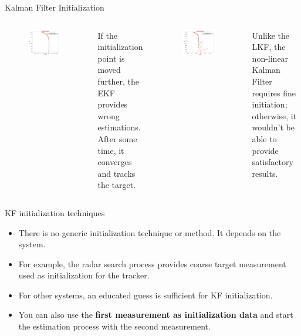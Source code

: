 \begin{frame}{Kalman Filter Initialization}
\begin{columns}
    \begin{figure}
        \centering
        \includegraphics[width=0.6\linewidth]{Figures//Part4/Ex11_InitializationAspects_Fine.png}
        \vspace{-5pt}
    \end{figure}
    If the initialization point is moved further, the EKF provides wrong estimations. After some time, it converges and tracks the target.
    \begin{figure}
        \centering
        \includegraphics[width=0.6\linewidth]{Figures//Part4/Ex11_InitializationAspects_Bad.png}
        \vspace{-5pt}
    \end{figure}
    Unlike the LKF, the non-linear Kalman Filter requires fine initiation; otherwise, it wouldn’t be able to provide satisfactory results.
\end{columns}
\end{frame}



\begin{frame}{KF initialization techniques}
\begin{itemize}
    \item There is no generic initialization technique or method. It depends on the system. 
    \item For example, the radar search process provides coarse target measurement used as initialization for the tracker.
    
    \item For other systems, an educated guess is sufficient for KF initialization.

    \item You can also use the \textbf{first measurement as initialization data} and start the estimation process with the second measurement.
\end{itemize}
\end{frame}


